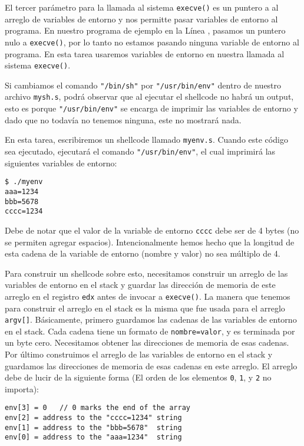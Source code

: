 El tercer parámetro para la llamada al sistema \texttt{execve()} es un puntero a al arreglo de variables de entorno y nos permitte pasar variables de entorno al programa. En nuestro programa de ejemplo en la Línea , pasamos un puntero nulo a \texttt{execve()}, por lo tanto no estamos pasando ninguna variable de entorno al programa. 
En esta tarea usaremos variables de entorno en nuestra llamada al sistema \texttt{execve()}.

Si cambiamos el comando \texttt{"/bin/sh"} por \texttt{"/usr/bin/env"} dentro de nuestro archivo \texttt{mysh.s}, podrá observar que al ejecutar el shellcode no habrá un output, esto es porque \texttt{"/usr/bin/env"} se encarga de imprimir las variables de entorno y dado que no todavía no tenemos ninguna, este no mostrará nada.

En esta tarea, escribiremos un shellcode llamado \texttt{myenv.s}. Cuando este código sea ejecutado, ejecutará el comando \texttt{"/usr/bin/env"}, el cual imprimirá las siguientes variables de entorno:

\begin{lstlisting}
$ ./myenv
aaa=1234
bbb=5678
cccc=1234
\end{lstlisting}

Debe de notar que el valor de la variable de entorno \texttt{cccc} debe ser de 4 bytes (no se permiten agregar espacios).
Intencionalmente hemos hecho que la longitud de esta cadena de la variable de entorno (nombre y valor) no sea múltiplo de 4.

Para construir un shellcode sobre esto, necesitamos construir un arreglo de las variables de entorno en el stack y guardar las dirección de memoria de este arreglo en el registro \texttt{edx}  antes de invocar a \texttt{execve()}. 
La manera que tenemos para construir el arreglo en el stack es la misma que fue usada para el arreglo  \texttt{argv[]}. 
Básicamente, primero guardamos las cadenas de las variables de entorno en el stack. Cada cadena tiene un formato de \texttt{nombre=valor}, y es terminada por un byte cero. Necesitamos obtener las direcciones de memoria de esas cadenas. Por último construimos el arreglo de las variables de entorno en el stack y guardamos las direcciones de memoria de esas cadenas en este arreglo.
El arreglo debe de lucir de la siguiente forma (El orden de los elementos \texttt{0}, \texttt{1}, y \texttt{2} no importa):


\begin{lstlisting}
env[3] = 0   // 0 marks the end of the array
env[2] = address to the "cccc=1234" string
env[1] = address to the "bbb=5678"  string
env[0] = address to the "aaa=1234"  string
\end{lstlisting}



